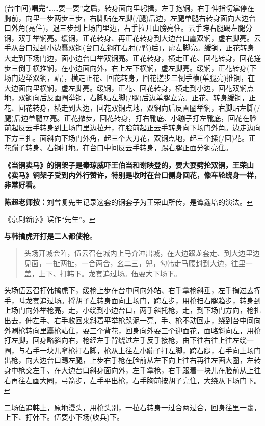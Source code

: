   (台中间)\textbf{唱完}``\ldots{}\ldots{}耍一耍''\textbf{之后}，转身面向里躬揖，左手抱锏，右手伸指切掌停在胸前，向里一步两步三步，右脚贴在左脚(/腿)后边，左腿单腿右转身面向大边台口外角(亮住)，退三步到上场门里边，右手拉开山膀亮住。云手跨右腿踢左腿分锏，双手举锏亮。缓锏，正花转身、再正花转身到大边台口矗双锏，虚右脚亮。云手从台口过到小边矗双锏(台口左锏在右肘(/臂)后)，虚左脚亮。缓锏，正花转身大走到下场门边，面小边台口举双锏亮。正花转身，横走正花、回花转身，回花搓步三倒手横推锏，在小边面向外，右上左下横锏，虚左脚亮。缓锏，正花转身(下场门边举双锏，站)，横走正花、回花转身，回花搓步三倒手横(单腿亮)推锏，在大边面向里横锏，虚左脚亮。缓锏，正花、回花转身，横走到小边，回花双锏点地，双锏向后反画圈举锏，右脚贴左脚(/腿)后边单腿立亮。正花、转身缓锏，正花、回花转身，横走到大边，回花双锏点地，双锏向后反画圈举锏，右脚贴左脚(/腿)后边单腿立亮。正花撤步，回花转身，打右靴底、小蹦子打左靴底，回花在脸前起反云手转身到上场门里边拉开，在脸前起正云手转身向下场门外角。边走边向下方三扎。面斜向下场门外角，起三个大刀花，双锏点地，起三个揉(/回)花。正花蹦子转身、右锏打地。在台口中间反云手转身，踢右腿正面分锏亮住。

  \textbf{《当锏卖马》的锏架子是秦琼威吓王伯当和谢映登的，要大耍劈抡双锏，王荣山《卖马》锏架子受到内外行赞许，特别是收时在台口侧身回花，像车轮绕身一样，非常好看。}

  \textbf{陈超老师按：}刘曾复先生记录这套的锏套子为王荣山所传，是谭鑫培的演法。\protect\hyperlink{fnref314}{↩}
\item
  \leavevmode\hypertarget{fn315}{}%
  《京剧新序》误作``先生''。\protect\hyperlink{fnref315}{↩}
\item
  \leavevmode\hypertarget{fn316}{}%
  \textbf{与韩擒虎开打是二人都使枪}。

  \begin{quote}
  头场开城会阵，伍云召在城内上马介冲出城，在大边跟龙套走、到大边里边见面，一扯两扯，一合两合，幺二三，兜，勾韩走马腰封到大边，往里一盖，上下、打韩下。龙套追过场。伍耍大下场下。
  \end{quote}

  头场伍云召打韩擒虎下，缓枪上步在台中间向外站、右手拿枪斜垂，左手掏过去挥手，叫龙套追过场。捋胡子左转身面向上场门，跨左步，用枪扫右腿趋步，转身到上场门向外举枪亮，走，小绕到小边台口，两手斜托枪，走，到下场门方向，枪扎出去，伸左手、右手收回来斜着平举枪跺泥一亮，手、枪不动回走，绕到台中间向外涮枪转向里矗枪站住，耍三个背花，回身向外耍三个迎面花，面略斜向左，用枪打左脚，回身略斜向右，枪经左手背绕过左手反手接枪，由下往右往上往左绕一圈，与右手一块儿拿枪打右脚，枪从上往左小蹦子打左脚，跨右腿，右手向上场门出枪，向大边台口踢左腿，上步右手枪在脸前从左下向上往右再往左画大圈，左转身中枪交左手、在大边台口斜身面向外，左手拿枪，右手跟着一块儿在脸前从上往右再往左画大圈，弓箭步，左手平出枪，右手胸前按胡子亮住，大绕从下场门下。\protect\hyperlink{fnref316}{↩}
\item
  \leavevmode\hypertarget{fn317}{}%
  二场伍追韩上，原地漫头，用枪头别，一拉右转身一过合两过合，回身往里一裹，上下、打韩下。伍耍小下场(收兵)下。

